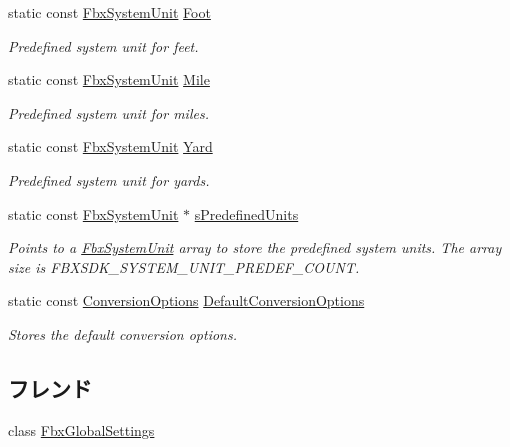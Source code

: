 \begin{DoxyCompactItemize}
static const \hyperlink{class_fbx_system_unit}{Fbx\+System\+Unit} \hyperlink{class_fbx_system_unit_a94d3bfe1b4fd69a021bbaff3a61a90d5}{Foot}
\begin{DoxyCompactList}\small\item\em Predefined system unit for feet. \end{DoxyCompactList}\item 
static const \hyperlink{class_fbx_system_unit}{Fbx\+System\+Unit} \hyperlink{class_fbx_system_unit_ae66f3c2d1e92b50cd4ba8bca95a7cb40}{Mile}
\begin{DoxyCompactList}\small\item\em Predefined system unit for miles. \end{DoxyCompactList}\item 
static const \hyperlink{class_fbx_system_unit}{Fbx\+System\+Unit} \hyperlink{class_fbx_system_unit_a4c9612d5387f7ac06a313efd63452cd4}{Yard}
\begin{DoxyCompactList}\small\item\em Predefined system unit for yards. \end{DoxyCompactList}\item 
static const \hyperlink{class_fbx_system_unit}{Fbx\+System\+Unit} $\ast$ \hyperlink{class_fbx_system_unit_a5a63e7dec80be27c252a24739a710505}{s\+Predefined\+Units}
\begin{DoxyCompactList}\small\item\em Points to a \hyperlink{class_fbx_system_unit}{Fbx\+System\+Unit} array to store the predefined system units. The array size is F\+B\+X\+S\+D\+K\+\_\+\+S\+Y\+S\+T\+E\+M\+\_\+\+U\+N\+I\+T\+\_\+\+P\+R\+E\+D\+E\+F\+\_\+\+C\+O\+U\+NT. \end{DoxyCompactList}\item 
static const \hyperlink{struct_fbx_system_unit_1_1_conversion_options}{Conversion\+Options} \hyperlink{class_fbx_system_unit_ae76376923416767b2a5f6a7e4e663064}{Default\+Conversion\+Options}
\begin{DoxyCompactList}\small\item\em Stores the default conversion options. \end{DoxyCompactList}\end{DoxyCompactItemize}
\subsection*{フレンド}
\begin{DoxyCompactItemize}
\item 
class \hyperlink{class_fbx_system_unit_ac6f6b3953bf13718eb87110d614b3c9a}{Fbx\+Global\+Settings}
\end{DoxyCompactItemize}


